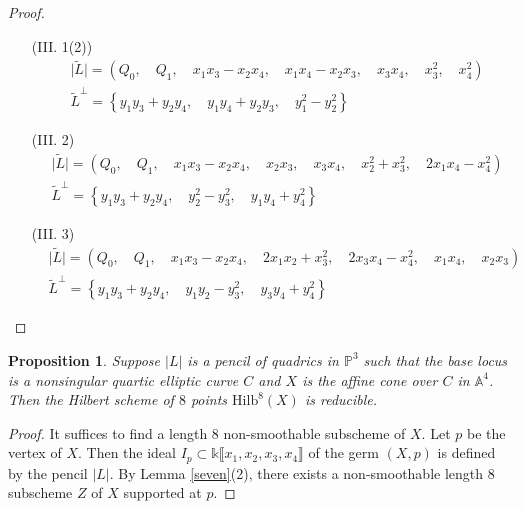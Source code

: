 \documentclass{amsart}[12pt]
\newtheorem{prop}[theorem]{Proposition}
\theoremstyle{definition}
\theoremstyle{remark}
\numberwithin{equation}{section}
\newcommand{\abs}[1]{\lvert#1\rvert}
\begin{document}
\begin{proof}
\begin{enumerate}
\item[(III. 1(2))]
\begin{align*}
& \abs{\tilde{L}} = (Q_0, \quad Q_1, \quad x_1x_3 - x_2x_4, \quad x_1x_4 - x_2x_3, \quad x_3x_4, \quad x_3^2, \quad x_4^2) \\
& \tilde{L}^{\perp} = \left\{ y_1y_3 + y_2y_4, \quad y_1y_4 + y_2y_3, \quad y_1^2 - y_2^2 \right\}
\end{align*}

\item[(III. 2)]
\begin{align*}
& \abs{\tilde{L}} = (Q_0, \quad Q_1, \quad x_1x_3 - x_2x_4, \quad x_2x_3, \quad x_3x_4, \quad x_2^2 + x_3^2, \quad 2x_1x_4 - x_4^2) \\
& \tilde{L}^{\perp} = \left\{ y_1y_3 + y_2y_4,   \quad y_2^2 - y_3^2, \quad y_1y_4 + y_4^2 \right\}
\end{align*}

\item[(III. 3)]
\begin{align*}
& \abs{\tilde{L}} = (Q_0, \quad Q_1, \quad x_1x_3 - x_2x_4, \quad 2x_1x_2 + x_3^2, \quad 2x_3x_4 - x_4^2, \quad x_1x_4, \quad x_2x_3) \\
& \tilde{L}^{\perp} = \left\{ y_1y_3 + y_2y_4,   \quad y_1y_2 - y_3^2, \quad y_3y_4 + y_4^2 \right\}
\end{align*}
\end{enumerate}
\end{proof}

\begin{prop}\label{twisted}
Suppose $\abs{L}$ is a pencil of quadrics in $\mathbb{P}^3$ such that the base locus is a nonsingular quartic elliptic curve $C$ and $X$ is the affine cone over $C$ in $\mathbb{A}^4$. Then the Hilbert scheme of $8$ points $\mathrm{Hilb}^8(X)$ is reducible. 
\end{prop}
\begin{proof}
It suffices to find a length 8 non-smoothable subscheme of $X$. Let $p$ be the vertex of $X$. Then the ideal $I_p \subset \mathbb{k}\llbracket x_1, x_2, x_3, x_4 \rrbracket$ of the germ $(X, p)$ is defined by the pencil $\abs{L}$. By Lemma \ref{seven}(2), there exists a non-smoothable length 8 subscheme $Z$ of $X$ supported at $p$. 
\end{proof}
\end{document}
